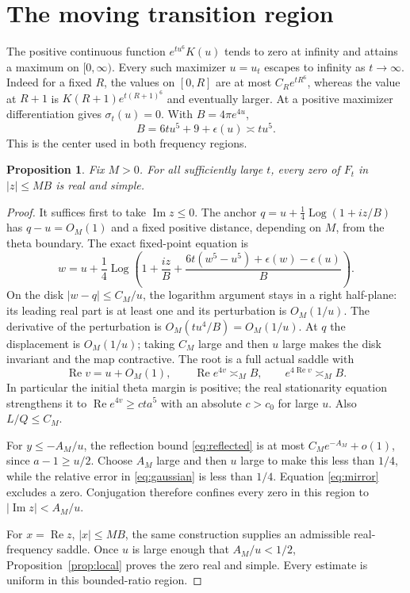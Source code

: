 \documentclass[11pt]{article}
\newtheorem{proposition}[theorem]{Proposition}
\DeclareMathOperator{\Log}{Log}
\begin{document}
\section{The moving transition region}
The positive continuous function $e^{tu^6}K(u)$ tends to
zero at infinity and attains a maximum on $[0,\infty)$.
Every such maximizer $u=u_t$ escapes to infinity as
$t\to\infty$. Indeed for a fixed $R$, the values on
$[0,R]$ are at most $C_R e^{tR^6}$, whereas the value
at $R+1$ is $K(R+1)e^{t(R+1)^6}$ and eventually larger.
At a positive maximizer differentiation gives
$\sigma_t(u)=0$. With $B=4\pi e^{4u}$,
\begin{equation}\label{eq:scale}
 B=6tu^5+9+\epsilon(u)\asymp tu^5.
\end{equation}
This is the center used in both frequency regions.

\begin{proposition}\label{prop:transition}
Fix $M>0$. For all sufficiently large $t$, every zero of
$F_t$ in $|z|\leq MB$ is real and simple.
\end{proposition}
\begin{proof}
It suffices first to take $\operatorname{Im}z\leq0$.
The anchor
$q=u+\tfrac14\Log(1+iz/B)$ has $q-u=O_M(1)$ and
a fixed positive distance, depending on $M$, from the
theta boundary. The exact fixed-point equation is
\begin{equation}\label{eq:transitionmap}
 w=u+\frac14\Log\left(1+\frac{iz}{B}
    +\frac{6t(w^5-u^5)+\epsilon(w)-\epsilon(u)}B\right).
\end{equation}
On the disk $|w-q|\leq C_M/u$, the logarithm argument
stays in a right half-plane: its leading real part is
at least one and its perturbation is $O_M(1/u)$.
The derivative of the perturbation is
$O_M(tu^4/B)=O_M(1/u)$. At $q$ the displacement is
$O_M(1/u)$; taking $C_M$ large and then $u$ large makes
the disk invariant and the map contractive. The root
is a full actual saddle with
\[
 \operatorname{Re}v=u+O_M(1),\qquad
 \operatorname{Re}e^{4v}\asymp_M B,\qquad
 e^{4\operatorname{Re}v}\asymp_M B.
\]
In particular the initial theta margin is positive; the
real stationarity equation strengthens it to
$\operatorname{Re}e^{4v}\geq cta^5$ with an absolute
$c>c_0$ for large $u$. Also $L/Q\leq C_M$.

For $y\leq-A_M/u$, the reflection bound
\eqref{eq:reflected} is at most $C_M e^{-A_M}+o(1)$,
since $a-1\geq u/2$. Choose $A_M$ large and then $u$
large to make this less than $1/4$, while the relative
error in \eqref{eq:gaussian} is less than $1/4$.
Equation \eqref{eq:mirror} excludes a zero. Conjugation
therefore confines every zero in this region to
$|\operatorname{Im}z|<A_M/u$.

For $x=\operatorname{Re}z$, $|x|\leq MB$, the same
construction supplies an admissible real-frequency saddle.
Once $u$ is large enough that $A_M/u<1/2$,
Proposition~\ref{prop:local} proves the zero real and
simple. Every estimate is uniform in this bounded-ratio region.
\end{proof}
\end{document}
